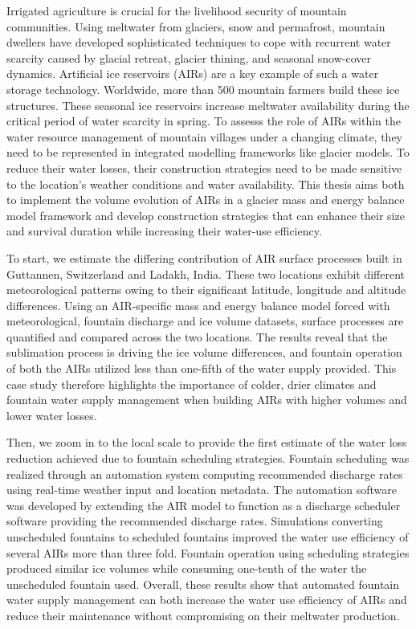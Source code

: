 %
\label{sec:abstract}

Irrigated agriculture is crucial for the livelihood security of mountain communities. Using meltwater from
glaciers, snow and permafrost, mountain dwellers have developed sophisticated techniques to cope with recurrent
water scarcity caused by glacial retreat, glacier thining, and seasonal snow-cover dynamics. Artificial ice
reservoirs (AIRs) are a key example of such a water storage technology. Worldwide, more than 500 mountain
farmers build these ice structures. These seasonal ice reservoirs increase meltwater availability during the
critical period of water scarcity in spring. To assesss the role of AIRs within the water resource management of
mountain villages under a changing climate, they need to be represented in integrated modelling frameworks like
glacier models. To reduce their water losses, their construction strategies need to be made sensitive to the
location's weather conditions and water availability. This thesis aims both to implement the volume evolution of
AIRs in a glacier mass and energy balance model framework and develop construction strategies that can enhance
their size and survival duration while increasing their water-use efficiency. 

To start, we estimate the differing contribution of AIR surface processes built in Guttannen, Switzerland and
Ladakh, India. These two locations exhibit different meteorological patterns owing to their significant
latitude, longitude and altitude differences. Using an AIR-specific mass and energy balance model forced with
meteorological, fountain discharge and ice volume datasets, surface processes are quantified and compared across
the two locations. The results reveal that the sublimation process is driving the ice volume differences, and
fountain operation of both the AIRs utilized less than one-fifth of the water supply provided. This case study
therefore highlights the importance of colder, drier climates and fountain water supply management when building
AIRs with higher volumes and lower water losses.  

Then, we zoom in to the local scale to provide the first estimate of the water loss reduction achieved due to
fountain scheduling strategies. Fountain scheduling was realized through an automation system computing
recommended discharge rates using real-time weather input and location metadata. The automation software was
developed by extending the AIR model to function as a discharge scheduler software providing the recommended discharge
rates. Simulations converting unscheduled fountains to scheduled fountains improved the water use efficiency of
several AIRs more than three fold. Fountain operation using scheduling strategies produced similar ice volumes
while consuming one-tenth of the water the unscheduled fountain used.  Overall, these results show that
automated fountain water supply management can both increase the water use efficiency of AIRs and reduce their
maintenance without compromising on their meltwater production.

